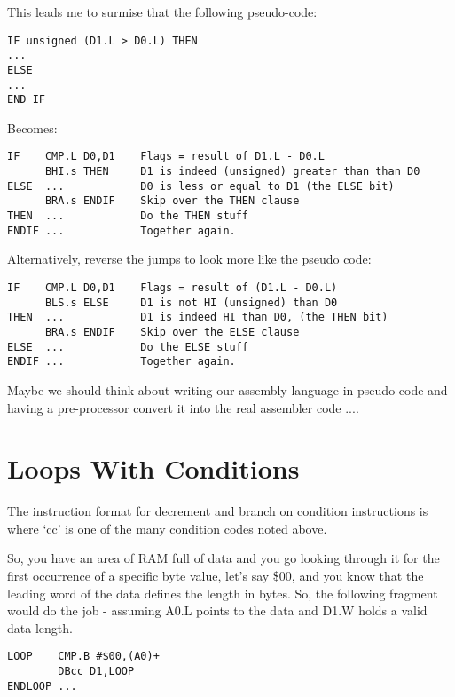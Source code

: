 This leads me to surmise that the following pseudo-{}code:

\begin{lstlisting}[firstnumber=1,]
IF unsigned (D1.L > D0.L) THEN
...
ELSE
...
END IF
\end{lstlisting}

Becomes:

\begin{lstlisting}[firstnumber=1,]
IF    CMP.L D0,D1    Flags = result of D1.L - D0.L
      BHI.s THEN     D1 is indeed (unsigned) greater than than D0
ELSE  ...            D0 is less or equal to D1 (the ELSE bit)
      BRA.s ENDIF    Skip over the THEN clause
THEN  ...            Do the THEN stuff
ENDIF ...            Together again.
\end{lstlisting}

Alternatively, reverse the jumps to look more like the pseudo code:

\begin{lstlisting}[firstnumber=1,]
IF    CMP.L D0,D1    Flags = result of (D1.L - D0.L)
      BLS.s ELSE     D1 is not HI (unsigned) than D0
THEN  ...            D1 is indeed HI than D0, (the THEN bit)
      BRA.s ENDIF    Skip over the ELSE clause
ELSE  ...            Do the ELSE stuff
ENDIF ...            Together again.
\end{lstlisting}

Maybe we should think about writing our assembly language in pseudo code and
        having a pre-{}processor convert it into the real assembler code ....

\section{Loops With Conditions}
\label{ch19-loop-conditions}%

The instruction format for decrement and branch on condition instructions is
         where `cc' is one of the many condition codes noted above.

So, you have an area of RAM full of data and you go looking through it for
        the first occurrence of a specific byte value, let's say \$00, and you know that
        the leading word of the data defines the length in bytes. So, the following
        fragment would do the job -{} assuming A0.L points to the data and D1.W holds a
        valid data length.

\begin{lstlisting}[firstnumber=1,]
LOOP    CMP.B #$00,(A0)+
        DBcc D1,LOOP
ENDLOOP ...
\end{lstlisting}

